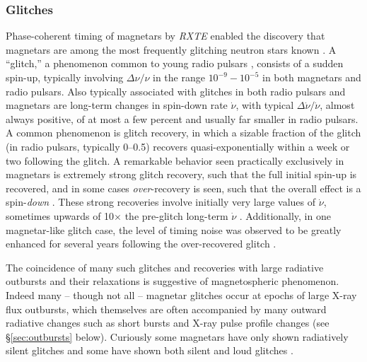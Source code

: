 \subsubsection{Glitches}
\label{sec:glitches}

Phase-coherent timing of magnetars by {\it RXTE} enabled the discovery that magnetars are among
the most frequently glitching neutron stars known \citep{klc00,dkg08}.  A ``glitch,''  a phenomenon common to
young radio pulsars \citep[e.g.][]{ymh+13}, consists of a sudden spin-up, typically involving $\Delta\nu/\nu$ in the range $10^{-9} - 10^{-5}$
in both magnetars and radio pulsars.  
Also typically associated with glitches in both radio pulsars and magnetars are long-term changes in spin-down rate $\dot{\nu}$, with
typical $\Delta\dot{\nu}/\dot{\nu}$, almost always positive, of at most a few percent and usually far smaller in radio pulsars.
A common phenomenon is glitch recovery, in which a sizable fraction of the glitch (in radio pulsars, 
typically 0--0.5) recovers quasi-exponentially within a week or two following the glitch.
A remarkable behavior seen practically exclusively in magnetars is extremely strong glitch recovery, such that the full
initial spin-up is recovered, and in some cases {\it over}-recovery is seen, such that the overall effect is a spin-{\it down}
\citep[e.g.][]{gdk11}.
These strong recoveries involve initially very large values of $\dot{\nu}$, sometimes upwards of 10$\times$ the 
pre-glitch long-term $\dot{\nu}$ \citep[e.g.][]{kgw+03,kg03,dis+03,wkt+04}. 
Additionally, in one magnetar-like glitch case, the level of timing noise was observed to be greatly
enhanced for several years following the over-recovered glitch \citep{lnk+11}.

The coincidence of many such glitches
and recoveries with large radiative outbursts and their relaxations is suggestive of magnetospheric phenomenon. 
Indeed many -- though not all -- magnetar glitches occur at epochs of large X-ray flux outbursts, which themselves
are often accompanied by many outward radiative changes such as short bursts and X-ray pulse profile changes (see \S\ref{sec:outbursts} below).
Curiously some magnetars have only shown radiatively silent glitches \citep[e.g. 1RXS J170849.0$-$400910; ][]{sak+14} and some have shown both
silent and loud glitches \citep[e.g. 1E~2259+586; ][]{dk14}.  

